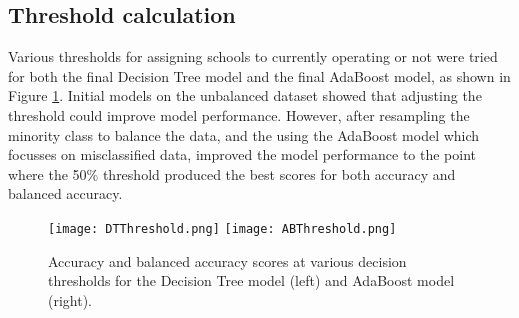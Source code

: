 \documentclass[11pt, letterpaper]{article}
\begin{document}
\subsection{Threshold calculation}

Various thresholds for assigning schools to currently operating or not were tried for both the final Decision Tree model and the final AdaBoost model, as shown in Figure \ref{fig:Thresholds}. Initial models on the unbalanced dataset showed that adjusting the threshold could improve model performance. However, after resampling the minority class to balance the data, and the using the AdaBoost model which focusses on misclassified data, improved the model performance to the point where the 50\% threshold produced the best scores for both accuracy and balanced accuracy.

\begin{figure}[h]
\begin{center}
\texttt{[image: DTThreshold.png]}
\texttt{[image: ABThreshold.png]}
\caption{Accuracy and balanced accuracy scores at various decision thresholds for the Decision Tree model (left) and AdaBoost model (right).} 
\label{fig:Thresholds}
\end{center}
\end{figure}
\end{document}
